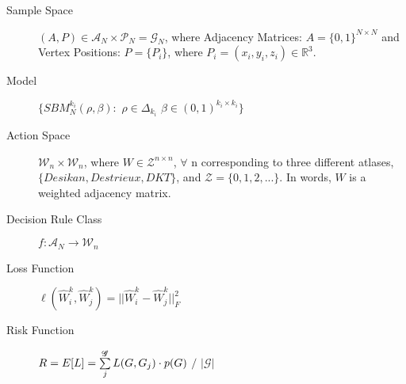 \documentclass[12pt]{article}
\begin{document}
\begin{description}

\item[Sample Space] $(A, P) \in \mathcal{A}_N \times \mathcal{P}_N = \mathscr{G}_N $, where 
 Adjacency Matrices: $A = \{0,1\}^{N \times N}$
and
Vertex Positions: $P= \{P_i\}$, where $P_i = (x_i,y_i,z_i) \in \mathbb{R}^3$.

\item[Model]
$  
\{SBM^{k_i}_N (\rho, \beta):$ 
$\rho \in \Delta_{k_i}$ 
$\beta \in (0,1)^{k_i \times k_i} \}$

\item[Action Space]

$ \mathcal{W}_{n} \times \mathcal{W}_{n}$, where 
$W \in \mathcal{Z}^{n \times n}$, 
$\forall$ n corresponding to three different atlases,
$\{Desikan, {Destrieux}, {DKT}\}$, and $\mathcal{Z} = \{0,1,2,...\}$.  In words, $W$ is a weighted adjacency matrix.

\item[Decision Rule Class]
$ f: \mathcal{A}_N \to \mathcal{W}_n$

\item[Loss Function]
$ \ell(\hat{W}^k_i, \hat{W}^k_j) = \lvert \lvert \hat{W}^k_i - \hat{W}^k_j \rvert \rvert^2_F$



\item[Risk Function]
$ \\ R = E[L] = \sum\limits_{j}^{\mathscr{G}} L(G, G_j) \cdot p(G)$ $/$ $\lvert \mathscr{G} \rvert$

\end{description}
\end{document}
